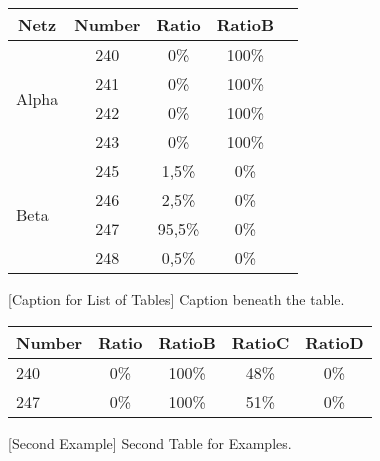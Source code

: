 \documentclass[../main]{subfiles}
\begin{document}
\vspace{1em}
\begin{table}[H]
	\centering
	\begin{tabular}{l|cccc}
		\toprule
		\multicolumn{1}{c}{\textbf{Netz}} 
		& \multicolumn{1}{c}{\textbf{Number}}
		& \multicolumn{1}{c}{\textbf{Ratio}}
		& \multicolumn{1}{c}{\textbf{RatioB}} \\
		\midrule
		\multirow{4}{*}{Alpha}
		& 240 & 0\% & 100\% \\
		& 241 & 0\% & 100\% \\
		& 242 & 0\% & 100\% \\
		& 243 & 0\% & 100\% \\
		\cmidrule(lr){1-1}
		\cmidrule(lr){2-4}
		\multirow{4}{*}{Beta}
		& 245 & 1,5\% & 0\% \\
		& 246 & 2,5\% & 0\% \\
		& 247 & 95,5\% & 0\% \\
		& 248 & 0,5\% & 0\% \\
		\bottomrule
	\end{tabular} 
	[Caption for List of Tables]
    {Caption beneath the table.}
	\label{tab:example_table}
\end{table}


\vspace{1em}
\begin{table}[H]
	\centering
	\begin{tabular}{l|cccc}
		\toprule
		\multicolumn{1}{c}{\textbf{Number}} 
		& \multicolumn{1}{c}{\textbf{Ratio}}
		& \multicolumn{1}{c}{\textbf{RatioB}} 
		& \multicolumn{1}{c}{\textbf{RatioC}}
		& \multicolumn{1}{c}{\textbf{RatioD}}\\
		\midrule
		240 	& 0\% & 100\% & 48\% & 0\% \\
		247 	& 0\% & 100\% & 51\% & 0\% \\
		\bottomrule
	\end{tabular} 
	[Second Example]
    {Second Table for Examples.}
	\label{tab:vergleich_netz_alpha_vs_beta}
\end{table}
\end{document}
